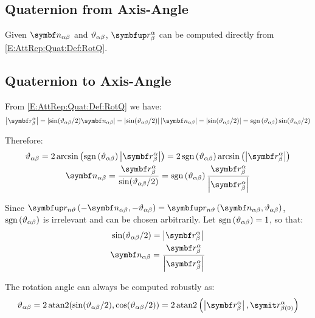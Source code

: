 \subsection{Quaternion from Axis-Angle}
Given $\vrel{\rotax}{\alpha}{\beta}$ and $\vartheta_{\alpha \beta}$, $\RotQ{\alpha}{\beta}$ can be computed directly from \eqref{E:AttRep:Quat:Def:RotQ}. 

\subsection{Quaternion to Axis-Angle}
From \eqref{E:AttRep:Quat:Def:RotQ} we have:
\begin{equation*}
	\norm{\imRotQ{\alpha}{\beta}} = \norm{\sin (\rel{\rotang}{\alpha}{\beta} / 2) \vrel{\rotax}{\alpha}{\beta}} =
	\abs{\sin (\rel{\rotang}{\alpha}{\beta} / 2)} \norm{\vrel{\rotax}{\alpha}{\beta}} =\abs{\sin (\rel{\rotang}{\alpha}{\beta} / 2)}=
	\sign{\rel{\rotang}{\alpha}{\beta}} \sin (\rel{\rotang}{\alpha}{\beta} / 2)
\end{equation*}

Therefore:
\begin{gather*}
	\rel{\rotang}{\alpha}{\beta} = 2 \arcsin \left( \sign{\rel{\rotang}{\alpha}{\beta}} \norm{\imRotQ{\alpha}{\beta}} \right) =
	2 \sign{\rel{\rotang}{\alpha}{\beta}} \arcsin \left( \norm{\imRotQ{\alpha}{\beta}} \right)
	\\
	\vrel{\rotax}{\alpha}{\beta} = \frac{\imRotQ{\alpha}{\beta}}{\sin (\rel{\rotang}{\alpha}{\beta} / 2)} =
	\sign{\rel{\rotang}{\alpha}{\beta}} \frac{\imRotQ{\alpha}{\beta}}{\norm{\imRotQ{\alpha}{\beta}}}
\end{gather*}

Since $\RotQAxAng{-\vrel{\rotax}{\alpha}{\beta}}{-\rel{\rotang}{\alpha}{\beta}} = \RotQAxAng{\vrel{\rotax}{\alpha}{\beta}}{\rel{\rotang}{\alpha}{\beta}}$, $\operatorname{sgn} \left({\vartheta_{\alpha \beta}}\right)$ is irrelevant and can be chosen arbitrarily. Let $\operatorname{sgn} \left({\vartheta_{\alpha \beta}}\right) = 1$, so that:
\begin{subequations}
\begin{gather}
	\sin (\rel{\rotang}{\alpha}{\beta} / 2) = \norm{\imRotQ{\alpha}{\beta}} \label{E:AttRep:Conv:Quat2AA:SinAngle}\\
	\vrel{\rotax}{\alpha}{\beta} = \frac{\imRotQ{\alpha}{\beta}}{\norm{\imRotQ{\alpha}{\beta}}} \label{E:AttRep:Conv:Quat2AA:Axis}
\end{gather}
\end{subequations}

The rotation angle can always be computed robustly as: 
\begin{equation} \label{E:AttRep:Conv:Quat2AA:Angle}
	\rel{\rotang}{\alpha}{\beta} = 2 \atan2( \sin(\rel{\rotang}{\alpha}{\beta} / 2), \cos(\rel{\rotang}{\alpha}{\beta} / 2)) = 2 \atan2 \left( \norm{\imRotQ{\alpha}{\beta}}, \reRotQ{\alpha}{\beta} \right)
\end{equation}

